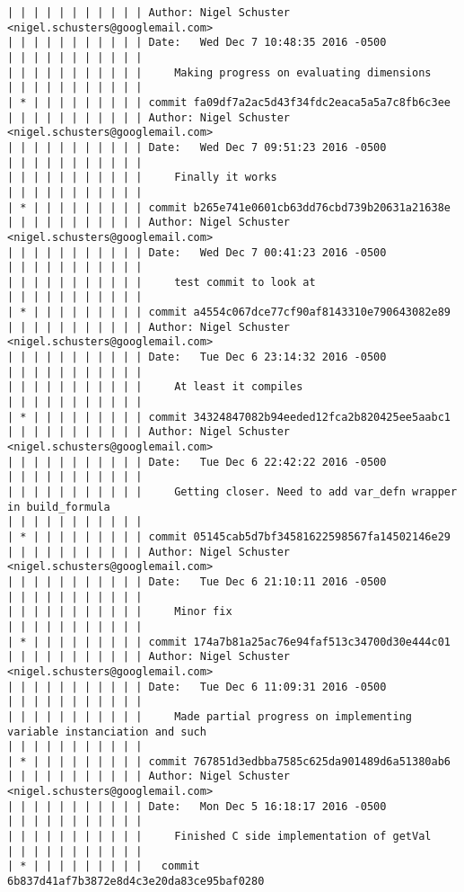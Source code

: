 \begin{lstlisting}
| | | | | | | | | | | Author: Nigel Schuster <nigel.schusters@googlemail.com>
| | | | | | | | | | | Date:   Wed Dec 7 10:48:35 2016 -0500
| | | | | | | | | | | 
| | | | | | | | | | |     Making progress on evaluating dimensions
| | | | | | | | | | |            
| * | | | | | | | | | commit fa09df7a2ac5d43f34fdc2eaca5a5a7c8fb6c3ee
| | | | | | | | | | | Author: Nigel Schuster <nigel.schusters@googlemail.com>
| | | | | | | | | | | Date:   Wed Dec 7 09:51:23 2016 -0500
| | | | | | | | | | | 
| | | | | | | | | | |     Finally it works
| | | | | | | | | | |            
| * | | | | | | | | | commit b265e741e0601cb63dd76cbd739b20631a21638e
| | | | | | | | | | | Author: Nigel Schuster <nigel.schusters@googlemail.com>
| | | | | | | | | | | Date:   Wed Dec 7 00:41:23 2016 -0500
| | | | | | | | | | | 
| | | | | | | | | | |     test commit to look at
| | | | | | | | | | |            
| * | | | | | | | | | commit a4554c067dce77cf90af8143310e790643082e89
| | | | | | | | | | | Author: Nigel Schuster <nigel.schusters@googlemail.com>
| | | | | | | | | | | Date:   Tue Dec 6 23:14:32 2016 -0500
| | | | | | | | | | | 
| | | | | | | | | | |     At least it compiles
| | | | | | | | | | |            
| * | | | | | | | | | commit 34324847082b94eeded12fca2b820425ee5aabc1
| | | | | | | | | | | Author: Nigel Schuster <nigel.schusters@googlemail.com>
| | | | | | | | | | | Date:   Tue Dec 6 22:42:22 2016 -0500
| | | | | | | | | | | 
| | | | | | | | | | |     Getting closer. Need to add var_defn wrapper in build_formula
| | | | | | | | | | |            
| * | | | | | | | | | commit 05145cab5d7bf34581622598567fa14502146e29
| | | | | | | | | | | Author: Nigel Schuster <nigel.schusters@googlemail.com>
| | | | | | | | | | | Date:   Tue Dec 6 21:10:11 2016 -0500
| | | | | | | | | | | 
| | | | | | | | | | |     Minor fix
| | | | | | | | | | |            
| * | | | | | | | | | commit 174a7b81a25ac76e94faf513c34700d30e444c01
| | | | | | | | | | | Author: Nigel Schuster <nigel.schusters@googlemail.com>
| | | | | | | | | | | Date:   Tue Dec 6 11:09:31 2016 -0500
| | | | | | | | | | | 
| | | | | | | | | | |     Made partial progress on implementing variable instanciation and such
| | | | | | | | | | |            
| * | | | | | | | | | commit 767851d3edbba7585c625da901489d6a51380ab6
| | | | | | | | | | | Author: Nigel Schuster <nigel.schusters@googlemail.com>
| | | | | | | | | | | Date:   Mon Dec 5 16:18:17 2016 -0500
| | | | | | | | | | | 
| | | | | | | | | | |     Finished C side implementation of getVal
| | | | | | | | | | |              
| * | | | | | | | | |   commit 6b837d41af7b3872e8d4c3e20da83ce95baf0280

\end{lstlisting}

